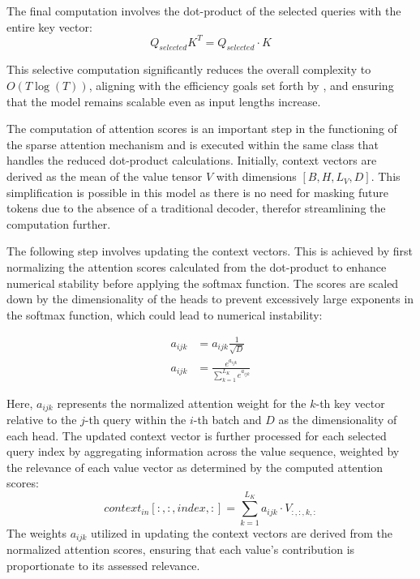 \documentclass{article}
\begin{document}
The final computation involves the dot-product of the selected queries with the entire key vector:
\begin{equation}
    Q_{selected}K^T = Q_{selected} \cdot K
\end{equation}

This selective computation significantly reduces the overall complexity to $O(T \log(T))$, aligning with the efficiency goals set forth by \cite{Informer}, and ensuring that the model remains scalable even as input lengths increase.


The computation of attention scores is an important step in the functioning of the sparse attention mechanism and is executed within the same class that handles the reduced dot-product calculations. Initially, context vectors are derived as the mean of the value tensor $V$ with dimensions $[B,H,L_V,D]$. This simplification is possible in this model as there is no need for masking future tokens due to the absence of a traditional decoder, therefor streamlining the computation further.

The following step involves updating the context vectors. This is achieved by first normalizing the attention scores calculated from the dot-product to enhance numerical stability before applying the softmax function. The scores are scaled down by the dimensionality of the heads to prevent excessively large exponents in the softmax function, which could lead to numerical instability:

\begin{align}
    a_{ijk} &= a_{ijk} \frac{1}{\sqrt{D}} \\
    a_{ijk} &= \frac{e^{a_{ijk}}}{\sum^{L_K}_{k=1}e^{a_{ijk}}}
\end{align}

Here, $a_{ijk}$ represents the normalized attention weight for the $k$-th key vector relative to the $j$-th query within the $i$-th batch and $D$ as the dimensionality of each head. The updated context vector is further processed for each selected query index by aggregating information across the value sequence, weighted by the relevance of each value vector as determined by the computed attention scores:
\begin{equation}
    context_{in}[:,:,index,:] = \sum^{L_K}_{k=1} a_{ijk} \cdot V_{:,:,k,:}
\end{equation}
The weights $a_{ijk}$ utilized in updating the context vectors are derived from the normalized attention scores, ensuring that each value's contribution is proportionate to its assessed relevance.
\end{document}
